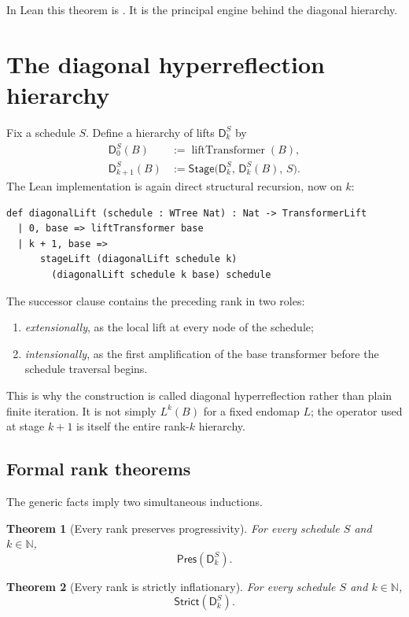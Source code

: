 \documentclass[11pt]{article}
\newtheorem{theorem}{Theorem}[section]
\theoremstyle{definition}
\newcommand{\Nat}{\mathbb{N}}
\newcommand{\Strict}{\mathsf{Strict}}
\newcommand{\stage}{\mathsf{Stage}}
\newcommand{\diag}{\mathsf{D}}
\begin{document}
In Lean this theorem is .  It is the principal engine behind the diagonal hierarchy.

\section{The diagonal hyperreflection hierarchy}

Fix a schedule $S$.  Define a hierarchy of lifts $\diag^S_k$ by
\begin{align*}
 \diag^S_0(B)&:=\operatorname{liftTransformer}(B),\\
 \diag^S_{k+1}(B)&:=
   \stage\bigl(\diag^S_k,\,\diag^S_k(B),\,S\bigr).
\end{align*}
The Lean implementation is again direct structural recursion, now on $k$:

\begin{lstlisting}[caption={The diagonal hierarchy.}]
def diagonalLift (schedule : WTree Nat) : Nat -> TransformerLift
  | 0, base => liftTransformer base
  | k + 1, base =>
      stageLift (diagonalLift schedule k)
        (diagonalLift schedule k base) schedule
\end{lstlisting}

The successor clause contains the preceding rank in two roles:
\begin{enumerate}
\item \emph{extensionally}, as the local lift at every node of the schedule;
\item \emph{intensionally}, as the first amplification of the base transformer before the schedule traversal begins.
\end{enumerate}
This is why the construction is called diagonal hyperreflection rather than plain finite iteration.  It is not simply $L^{k}(B)$ for a fixed endomap $L$; the operator used at stage $k+1$ is itself the entire rank-$k$ hierarchy.

\subsection{Formal rank theorems}

The generic facts imply two simultaneous inductions.

\begin{theorem}[Every rank preserves progressivity]
For every schedule $S$ and $k\in\Nat$,
\[
  \mathsf{Pres}(\diag^S_k).
\]
\end{theorem}

\begin{theorem}[Every rank is strictly inflationary]
For every schedule $S$ and $k\in\Nat$,
\[
  \Strict(\diag^S_k).
\]
\end{theorem}
\end{document}
